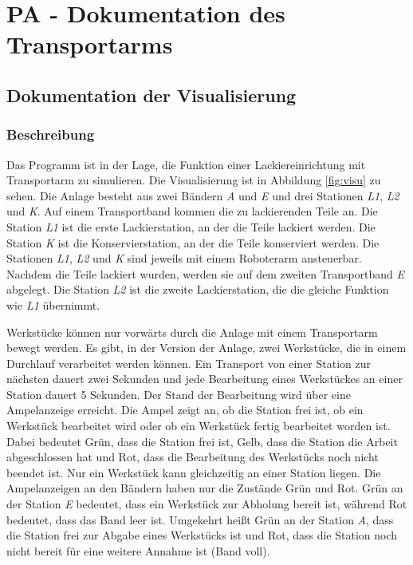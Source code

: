 \documentclass{report}
\begin{document}
\newpage

\tableofcontents

\listoffigures

\newpage

\chapter{PA - Dokumentation des Transportarms}

\section{Dokumentation der Visualisierung}
\label{sec:einfuhrung}

\subsection{Beschreibung}

Das Programm ist in der Lage, die Funktion einer Lackiereinrichtung mit Transportarm zu simulieren. Die Visualisierung ist in Abbildung \ref{fig:visu} zu sehen. Die Anlage besteht aus zwei Bändern \textit{A} und \textit{E} und drei Stationen \textit{L1}, \textit{L2} und \textit{K}. Auf einem Transportband kommen die zu lackierenden Teile an. Die Station \textit{L1} ist die erste Lackierstation, an der die Teile lackiert werden. Die Station \textit{K} ist die Konservierstation, an der die Teile konserviert werden. Die Stationen \textit{L1}, \textit{L2} und \textit{K} sind jeweils mit einem Roboterarm ansteuerbar. Nachdem die Teile lackiert wurden, werden sie auf dem zweiten Transportband \textit{E} abgelegt. Die Station \textit{L2} ist die zweite Lackierstation, die die gleiche Funktion wie \textit{L1} übernimmt. 

Werkstücke können nur vorwärts durch die Anlage mit einem Transportarm bewegt werden. Es gibt, in der Version der Anlage, zwei Werkstücke, die in einem Durchlauf verarbeitet werden können. Ein Transport von einer Station zur nächsten dauert zwei Sekunden und jede Bearbeitung eines Werkstückes an einer Station dauert 5 Sekunden. Der Stand der Bearbeitung wird über eine Ampelanzeige erreicht. Die Ampel zeigt an, ob die Station frei ist, ob ein Werkstück bearbeitet wird oder ob ein Werkstück fertig bearbeitet worden ist. Dabei bedeutet Grün, dass die Station frei ist, Gelb, dass die Station die Arbeit abgeschlossen hat und Rot, dass die Bearbeitung des Werkstücks noch nicht beendet ist. Nur ein Werkstück kann gleichzeitig an einer Station liegen. Die Ampelanzeigen an den Bändern haben nur die Zustände Grün und Rot. Grün an der Station \textit{E} bedeutet, dass ein Werkstück zur Abholung bereit ist, während Rot bedeutet, dass das Band leer ist. Umgekehrt heißt Grün an der Station \textit{A}, dass die Station frei zur Abgabe eines Werkstücks ist und Rot, dass die Station noch nicht bereit für eine weitere Annahme ist (Band voll).
\end{document}

